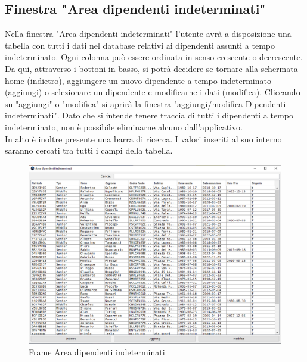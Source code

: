         \subsection {Finestra "Area dipendenti indeterminati"}
            Nella finestra "Area dipendenti indeterminati" l'utente avrà a disposizione una tabella con tutti i dati nel database relativi ai dipendenti assunti a tempo indeterminato. Ogni colonna può essere ordinata in senso crescente o decrescente.\\
            Da qui, attraverso i bottoni in basso, si potrà decidere se tornare alla schermata home (indietro), aggiungere un nuovo dipendente a tempo indeterminato (aggiungi) o selezionare un dipendente e modificarne i dati (modifica). Cliccando su "aggiungi" o "modifica" si aprirà la finestra "aggiungi/modifica Dipendenti indeterminati". Dato che si intende tenere traccia di tutti i dipendenti a tempo indeterminato, non è possibile eliminarne alcuno dall'applicativo.\\
            In alto è inoltre presente una barra di ricerca. I valori inseriti al suo interno saranno cercati tra tutti i campi della tabella.
            \begin{figure}[htbp!]
                \centering
                    \vspace{2\baselineskip}
                    \includegraphics[width=0.9\linewidth]{Immagini/Frames/Frame Area/Frame Area dipendenti indeterminati.png}
                \caption{Frame Area dipendenti indeterminati}
                \label{fig:Frame Area dipendenti indeterminati}
            \end{figure}

    \newpage

